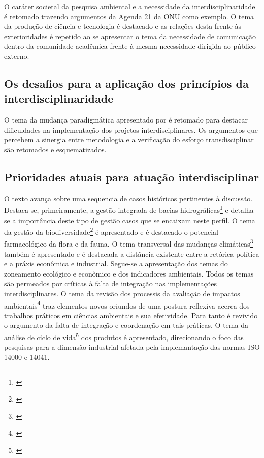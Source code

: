\documentclass[
   article,       %
   12pt,          %
   oneside,       %
   a4paper,       %
   english,       %
   brazil,           %
   sumario=tradicional
   ]{abntex2}
\begin{document}
O caráter societal da pesquisa ambiental e a necessidade da interdisciplinaridade é retomado trazendo argumentos da Agenda 21 da ONU como exemplo. O tema da produção de ciência e tecnologia é destacado e as relações desta frente às exterioridades é repetido ao se apresentar o tema da necessidade de comunicação dentro da comunidade acadêmica frente à mesma necessidade dirigida ao público externo.


\subsection{Os desafios para a aplicação dos princípios da interdisciplinaridade}

O tema da mudança paradigmática apresentado por \cite{Kuhn2012-oa} é retomado para destacar dificuldades na implementação dos projetos interdisciplinares. Os argumentos que percebem a sinergia entre metodologia e a verificação do esforço transdisciplinar são retomados e esquematizados.


\subsection{Prioridades atuais para atuação interdisciplinar}

O texto avança sobre uma sequencia de casos históricos pertinentes à discussão. Destaca-se, primeiramente, a gestão integrada de bacias hidrográficas\footnote{\cite[p.177]{modernas_Interdisciplinar}} e detalha-se a importância deste tipo de gestão casos que se encaixam neste perfil. O tema da gestão da biodiversidade\footnote{\cite[p.177]{modernas_Interdisciplinar}} é 
apresentado e é destacado o potencial farmacológico da flora e da fauna. O tema transversal das mudanças climáticas\footnote{\cite[p.179]{modernas_Interdisciplinar}} também é apresentado e é destacada a distância existente entre a retórica política e a práxis econômica e industrial. Segue-se a apresentação dos temas do zoneamento ecológico e econômico e dos indicadores ambientais. Todos os temas são permeados por críticas à falta de integração nas implementações interdisciplinares. O tema da revisão dos processis da avaliação de impactos ambientais\footnote{\cite[p.181]{modernas_Interdisciplinar}} traz elementos novos oriundos de uma postura reflexiva acerca dos trabalhos práticos em ciências ambientais e sua efetividade. Para tanto é revivido o argumento da falta de integração e coordenação em tais práticas. O tema da análise de ciclo de vida\footnote{\cite[p.182]{modernas_Interdisciplinar}} dos produtos é apresentado, direcionando o foco das pesquisas para a dimensão industrial afetada pela implemantação das normas ISO 14000 e 14041.
\end{document}
